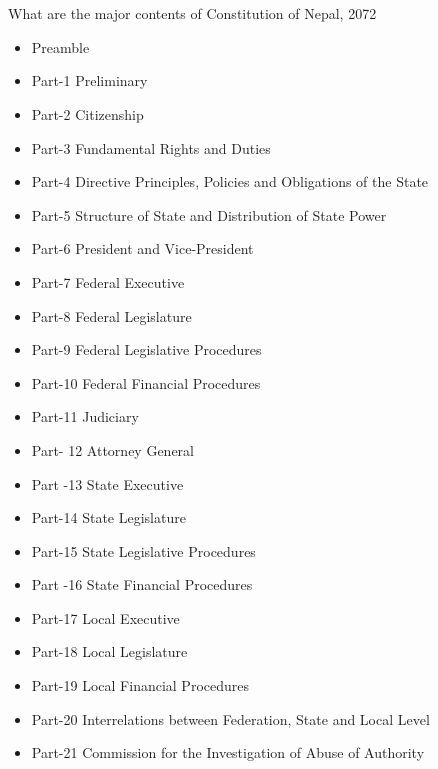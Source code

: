 \section*{}

\subsection*{}

\begin{questions}

\question What are the major contents of Constitution of Nepal, 2072
  \begin{solution}
  \begin{itemize}
  \item Preamble
  \item Part-1 Preliminary
  \item Part-2 Citizenship
  \item Part-3 Fundamental Rights and Duties
  \item Part-4 Directive Principles, Policies and Obligations of the State
  \item Part-5 Structure of State and Distribution of State Power
  \item Part-6 President and Vice-President
  \item Part-7 Federal Executive
  \item Part-8 Federal Legislature
  \item Part-9 Federal Legislative Procedures
  \item Part-10 Federal Financial Procedures
  \item Part-11 Judiciary
  \item Part- 12 Attorney General
  \item Part -13 State Executive
  \item Part-14 State Legislature
  \item Part-15 State Legislative Procedures
  \item Part -16 State Financial Procedures
  \item Part-17 Local Executive
  \item Part-18 Local Legislature
  \item Part-19 Local Financial Procedures
  \item Part-20 Interrelations between Federation, State and Local Level
  \item Part-21 Commission for the Investigation of Abuse of Authority

\end{itemize}
\end{solution}
\end{questions}
